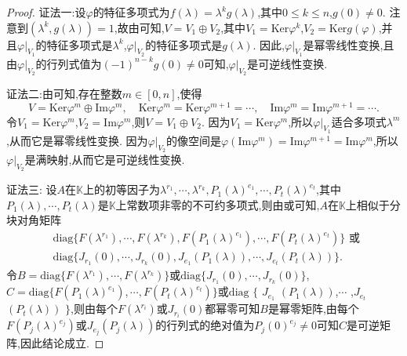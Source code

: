 \documentclass[../../main.tex]{subfiles}%
\begin{document}
\begin{proof}

{\color{blue}证法一:}设$\varphi$的特征多项式为$f(\lambda)=\lambda^kg(\lambda)$,其中$0\leqslant k\leqslant n$,$g(0)\neq 0$. 注意到$(\lambda^k,g(\lambda)) = 1$,故由可知,$V = V_1\oplus V_2$,其中$V_1=\mathrm{Ker}\varphi^k$,$V_2=\mathrm{Ker}g(\varphi)$,并且$\varphi|_{V_1}$的特征多项式是$\lambda^k$,$\varphi|_{V_2}$的特征多项式是$g(\lambda)$. 因此,$\varphi|_{V_1}$是幂零线性变换,且由$\varphi|_{V_2}$的行列式值为$(-1)^{n - k}g(0)\neq 0$可知,$\varphi|_{V_2}$是可逆线性变换.

{\color{blue}证法二:}由可知,存在整数$m\in[0,n]$,使得
\[V=\mathrm{Ker}\varphi^m\oplus\mathrm{Im}\varphi^m,\quad \mathrm{Ker}\varphi^m=\mathrm{Ker}\varphi^{m + 1}=\cdots,\quad \mathrm{Im}\varphi^m=\mathrm{Im}\varphi^{m + 1}=\cdots.\]
令$V_1=\mathrm{Ker}\varphi^m$,$V_2=\mathrm{Im}\varphi^m$,则$V = V_1\oplus V_2$. 因为$V_1=\mathrm{Ker}\varphi^m$,所以$\varphi|_{V_1}$适合多项式$\lambda^m$,从而它是幂零线性变换. 因为$\varphi|_{V_2}$的像空间是$\varphi(\mathrm{Im}\varphi^m)=\mathrm{Im}\varphi^{m + 1}=\mathrm{Im}\varphi^m$,所以$\varphi|_{V_2}$是满映射,从而它是可逆线性变换. 

{\color{blue}证法三:}
设$A$在$\mathbb{K}$上的初等因子为$\lambda^{r_1},\cdots,\lambda^{r_k},P_1(\lambda)^{e_1},\cdots,P_t(\lambda)^{e_t}$,其中$P_1(\lambda),\cdots,P_t(\lambda)$是$\mathbb{K}$上常数项非零的不可约多项式,则由或可知,$A$在$\mathbb{K}$上相似于分块对角矩阵
\begin{align*}
&\mathrm{diag}\{F(\lambda^{r_1}),\cdots,F(\lambda^{r_k}),F(P_1(\lambda)^{e_1}),\cdots,F(P_t(\lambda)^{e_t})\}\text{ 或 }\\
&\mathrm{diag}\{J_{r_1}(0),\cdots,J_{r_k}(0),J_{e_1}(P_1(\lambda)),\cdots,J_{e_t}(P_t(\lambda))\}.
\end{align*}
令$B = \mathrm{diag}\{F(\lambda^{r_1}),\cdots,F(\lambda^{r_k})\}$或$\mathrm{diag}\{J_{r_1}(0),\cdots,J_{r_k}(0)\}$,$C = \mathrm{diag}\{F(P_1(\lambda)^{e_1}),\cdots,F(P_t(\lambda)^{e_t})\}$或$\mathrm{diag}$ $\{$ $J_{e_1}$ $(P_1(\lambda))$,$\cdots$ ,$J_{e_t}$ $(P_t(\lambda))$ $\}$,则由每个$F(\lambda^{r_i})$或$J_{r_i}(0)$都幂零可知$B$是幂零矩阵,由每个$F(P_j(\lambda)^{e_j})$或$J_{e_j}(P_j(\lambda))$的行列式的绝对值为$P_j(0)^{e_j}\neq 0$可知$C$是可逆矩阵,因此结论成立.
\end{proof}
\end{document}
